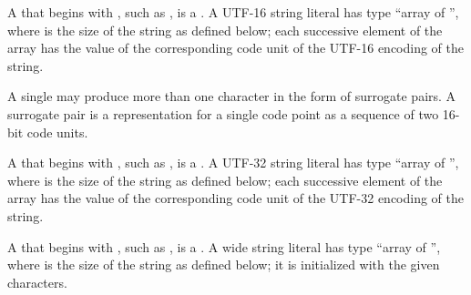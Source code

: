 \documentclass{wg21}
\begin{document}
\begin{removedblock}
\pnum
{}%
%
%
A  that begins with ,
%
such as , is
a .
A UTF-16 string literal has
type ``array of  '', where  is the
size of the string as defined below;
each successive element of the array
has the value of the corresponding code unit of
the UTF-16 encoding of the string.
\begin{note}
    A single  may
    produce more than one  character in the form of
    surrogate pairs.
    A surrogate pair is a representation for a single code point
    as a sequence of two 16-bit code units.
\end{note}

\pnum
{}%
%
%
A  that begins with ,
%
such as , is
a .
A UTF-32 string literal has
type ``array of  '', where  is the
size of the string as defined below;
each successive element of the array
has the value of the corresponding code unit of
the UTF-32 encoding of the string.

\pnum
{}%
A  that begins with ,
%
such as , is a .
%
%
%
%
A wide string literal has type ``array of  '', where  is the size of the string as defined below; it
is initialized with the given characters.

\end{removedblock}
\end{document}
